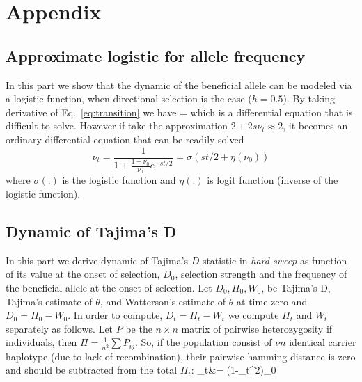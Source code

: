 \documentclass[11pt]{article}
\begin{document}
\clearpage
\setcounter{figure}{0}
\setcounter{table}{0}
\setcounter{equation}{0}
\renewcommand{\thefigure}{S\arabic{figure}}
\renewcommand{\thetable}{S\arabic{table}}
\renewcommand{\theequation}{S\arabic{equation}}

\section{Appendix}
\subsection{Approximate logistic for allele frequency} \label{app:af}
In this part we show that the dynamic of the beneficial allele can be modeled 
via a logistic function, when directional selection is the case ($h=0.5$). By 
taking derivative of Eq.~\ref{eq:transition} we have
\beq
{} = 
\eeq
which is a differential equation that is difficult to solve. However if take 
the approximation $2+2s\nu_t \approx 2$, it becomes an 
ordinary differential equation that can be readily solved
\begin{equation}
\nu_t =\frac{1}{1+\frac{1-\nu_0}{\nu_0}e^{-st/2}} = \sigma(st/2+\eta(\nu_0)) 
\label{eq:inf-pop}
\end{equation}
where $\sigma(.)$ is the logistic function and $\eta(.)$ is logit function 
(inverse of the logistic function). 

\subsection{Dynamic of Tajima's D}\label{app:td}
In this part we derive dynamic of Tajima's $D$ statistic in \emph{hard sweep} 
as function of its 
value at the onset of selection, $D_0$, selection strength and the frequency of 
the beneficial allele at the onset of selection.
Let $D_0, \Pi_0, W_0$, be Tajima's D, Tajima's estimate of  $\theta$, and 
Watterson's estimate of $\theta$ at time zero and $D_0=\Pi_0 - W_0$.
In order to compute, $D_t=\Pi_t - W_t$ we compute $\Pi_t$ and $W_t$ separately 
as follows. Let $P$ be the $n \times n$ matrix of pairwise heterozygosity if 
individuals, 
then $\Pi=\frac{1}{n^2}\sum P_{ij}$. So, if the population consist of $\nu n$ 
identical carrier haplotype (due to lack of recombination), their pairwise 
hamming distance is zero and should be subtracted from the total $\Pi_t$:
\beq
\Pi_t&= (1-\nu_t^2)\Pi_0 \label{eq:tdt0}
\eeq
\end{document}
